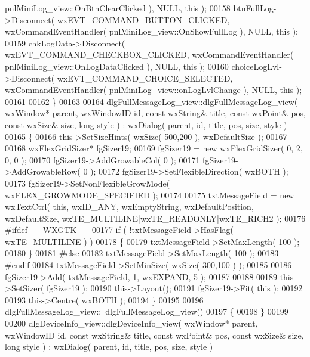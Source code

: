 \begin{DoxyCode}
      pnlMiniLog_view::OnBtnClearClicked ), NULL, \textcolor{keyword}{this} );
00158     btnFullLog->Disconnect( wxEVT\_COMMAND\_BUTTON\_CLICKED, wxCommandEventHandler( 
      pnlMiniLog_view::OnShowFullLog ), NULL, \textcolor{keyword}{this} );
00159     chkLogData->Disconnect( wxEVT\_COMMAND\_CHECKBOX\_CLICKED, wxCommandEventHandler( 
      pnlMiniLog_view::OnLogDataClicked ), NULL, \textcolor{keyword}{this} );
00160     choiceLogLvl->Disconnect( wxEVT\_COMMAND\_CHOICE\_SELECTED, wxCommandEventHandler( 
      pnlMiniLog_view::onLogLvlChange ), NULL, \textcolor{keyword}{this} );
00161     
00162 \}
00163 
00164 dlgFullMessageLog_view::dlgFullMessageLog_view( wxWindow* parent, wxWindowID \textcolor{keywordtype}{id}, \textcolor{keyword}{const} wxString& title, \textcolor{keyword}{
      const} wxPoint& pos, \textcolor{keyword}{const} wxSize& size, \textcolor{keywordtype}{long} style ) : wxDialog( parent, id, title, pos, size, style )
00165 \{
00166     this->SetSizeHints( wxSize( 500,200 ), wxDefaultSize );
00167     
00168     wxFlexGridSizer* fgSizer19;
00169     fgSizer19 = \textcolor{keyword}{new} wxFlexGridSizer( 0, 2, 0, 0 );
00170     fgSizer19->AddGrowableCol( 0 );
00171     fgSizer19->AddGrowableRow( 0 );
00172     fgSizer19->SetFlexibleDirection( wxBOTH );
00173     fgSizer19->SetNonFlexibleGrowMode( wxFLEX\_GROWMODE\_SPECIFIED );
00174     
00175     txtMessageField = \textcolor{keyword}{new} wxTextCtrl( \textcolor{keyword}{this}, wxID\_ANY, wxEmptyString, wxDefaultPosition, wxDefaultSize, 
      wxTE\_MULTILINE|wxTE\_READONLY|wxTE\_RICH2 );
00176 \textcolor{preprocessor}{    #ifdef \_\_WXGTK\_\_}
00177     \textcolor{keywordflow}{if} ( !txtMessageField->HasFlag( wxTE\_MULTILINE ) )
00178     \{
00179     txtMessageField->SetMaxLength( 100 );
00180     \}
00181 \textcolor{preprocessor}{    #else}
00182     txtMessageField->SetMaxLength( 100 );
00183 \textcolor{preprocessor}{    #endif}
00184     txtMessageField->SetMinSize( wxSize( 300,100 ) );
00185     
00186     fgSizer19->Add( txtMessageField, 1, wxEXPAND, 5 );
00187     
00188     
00189     this->SetSizer( fgSizer19 );
00190     this->Layout();
00191     fgSizer19->Fit( \textcolor{keyword}{this} );
00192     
00193     this->Centre( wxBOTH );
00194 \}
00195 
00196 dlgFullMessageLog_view::~dlgFullMessageLog_view()
00197 \{
00198 \}
00199 
00200 dlgDeviceInfo_view::dlgDeviceInfo_view( wxWindow* parent, wxWindowID \textcolor{keywordtype}{id}, \textcolor{keyword}{const} wxString& title, \textcolor{keyword}{const} 
      wxPoint& pos, \textcolor{keyword}{const} wxSize& size, \textcolor{keywordtype}{long} style ) : wxDialog( parent, id, title, pos, size, style )

\end{DoxyCode}
